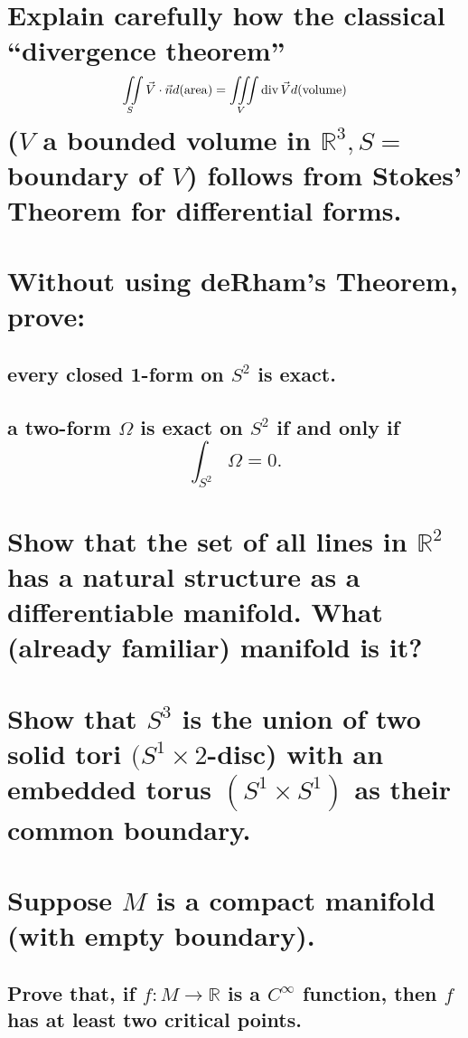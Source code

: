 \documentclass[10pt]{article}
\begin{document}
 

\section{Explain carefully how the classical ``divergence theorem''
$$\iint\limits_S \vec{V} \cdot \vec{n} d(\mathrm{area}) = \iiint\limits_V \operatorname{div} \vec{V} d(\mathrm{volume})$$
($V$ a bounded volume in $\mathbb{R} ^3, S= $ boundary of $V$) follows from Stokes' Theorem for
differential forms.}

\section{Without using deRham's Theorem, prove:}

\subsection{every closed 1-form on $S^2$ is exact.}

\subsection{a two-form $\Omega$ is exact on $S^2$ if and only if 
$$\int_{S^2}\Omega=0.$$}

\section{Show that the set of all lines in $\mathbb{R} ^2$ has a natural structure as a
  differentiable manifold. What (already familiar) manifold is it?}

\section{Show that $S^3$ is the union of two solid tori $(S^1 \times 2$-disc) with an embedded torus
  $(S^1 \times S^1)$ as their common boundary. }

\section{Suppose $M$ is a compact manifold (with empty boundary).}

\subsection{Prove that, if $f: M \to \mathbb{R}$ is a $C^\infty$ function, then $f$ has at least two
critical points.}
\end{document}

